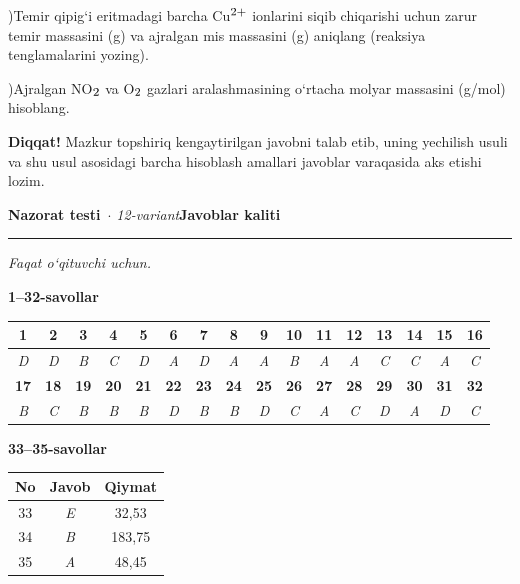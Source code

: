 \documentclass[11pt,a4paper]{article}
\renewcommand{\textsubscript}[1]{\ensuremath{_{\text{\fontsize{8}{8}\selectfont #1}}}}
\renewcommand{\textsuperscript}[1]{\ensuremath{^{\text{\fontsize{8}{8}\selectfont #1}}}}
\newcommand{\qsep}{\par\vspace{1pt}\noindent\rule{0pt}{0.4pt}\par\vspace{5pt}}
\newcommand{\diqqat}[1]{\par\smallskip\noindent\textbf{Diqqat!} #1\par\medskip}
\begin{document}
)Temir qipig`i eritmadagi barcha Cu\textsuperscript{2+} ionlarini siqib chiqarishi uchun zarur temir massasini (g) va ajralgan mis massasini (g) aniqlang (reaksiya tenglamalarini yozing).\par
{})Ajralgan NO\textsubscript{2} va O\textsubscript{2} gazlari aralashmasining o`rtacha molyar massasini (g/mol) hisoblang.\par
\diqqat{Mazkur topshiriq kengaytirilgan javobni talab etib, uning yechilish usuli va shu usul asosidagi barcha hisoblash amallari javoblar varaqasida aks etishi lozim.}\qsep
\newpage
\noindent\textbf{\fontsize{13}{15}\selectfont Nazorat testi}\ \textit{$\cdot$ 12-variant}\hfill \textbf{Javoblar kaliti}\par\smallskip\hrule\smallskip
\textit{Faqat o`qituvchi uchun.}\par\medskip
\noindent\textbf{1--32-savollar}\par\smallskip
\noindent\begin{tabular}{|c|c|c|c|c|c|c|c|c|c|c|c|c|c|c|c|}\hline
\textbf{1} & \textbf{2} & \textbf{3} & \textbf{4} & \textbf{5} & \textbf{6} & \textbf{7} & \textbf{8} & \textbf{9} & \textbf{10} & \textbf{11} & \textbf{12} & \textbf{13} & \textbf{14} & \textbf{15} & \textbf{16}\\\hline
\textsl{D} & \textsl{D} & \textsl{B} & \textsl{C} & \textsl{D} & \textsl{A} & \textsl{D} & \textsl{A} & \textsl{A} & \textsl{B} & \textsl{A} & \textsl{A} & \textsl{C} & \textsl{C} & \textsl{A} & \textsl{C}\\\hline
\textbf{17} & \textbf{18} & \textbf{19} & \textbf{20} & \textbf{21} & \textbf{22} & \textbf{23} & \textbf{24} & \textbf{25} & \textbf{26} & \textbf{27} & \textbf{28} & \textbf{29} & \textbf{30} & \textbf{31} & \textbf{32}\\\hline
\textsl{B} & \textsl{C} & \textsl{B} & \textsl{B} & \textsl{B} & \textsl{D} & \textsl{B} & \textsl{B} & \textsl{D} & \textsl{C} & \textsl{A} & \textsl{C} & \textsl{D} & \textsl{A} & \textsl{D} & \textsl{C}\\\hline
\end{tabular}\par\medskip
\noindent\textbf{33--35-savollar}\par\smallskip
\noindent\begin{tabular}{|c|c|c|}\hline \textbf{No} & \textbf{Javob} & \textbf{Qiymat}\\\hline
33 & \textsl{E} & 32,53\\\hline
34 & \textsl{B} & 183,75\\\hline
35 & \textsl{A} & 48,45\\\hline
\end{tabular}\par\medskip
\end{document}
